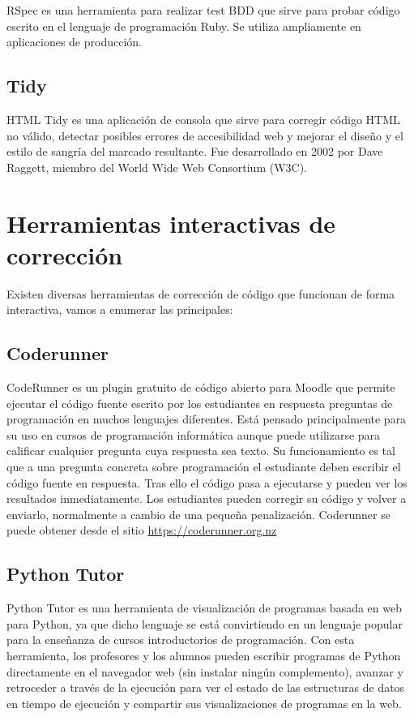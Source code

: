 RSpec es una herramienta para realizar test BDD que sirve para probar código escrito en el lenguaje de programación Ruby. Se utiliza ampliamente en aplicaciones de producción.

\subsection {Tidy}

HTML Tidy es una aplicación de consola que sirve para corregir código HTML no válido, detectar posibles errores de accesibilidad web y mejorar el diseño y el estilo de sangría del marcado resultante. Fue desarrollado en 2002 por Dave Raggett, miembro del World Wide Web Consortium (W3C).

\section {Herramientas interactivas de corrección}

Existen diversas herramientas de corrección de código que funcionan de forma interactiva, vamos a enumerar las principales:

\subsection {Coderunner}

CodeRunner es un plugin gratuito de código abierto para Moodle que permite ejecutar el código fuente escrito por los estudiantes en respuesta preguntas de programación en muchos lenguajes diferentes. Está pensado principalmente para su uso en cursos de programación informática aunque puede utilizarse para calificar cualquier pregunta cuya respuesta sea texto. Su funcionamiento es tal que a una pregunta concreta sobre programación el estudiante deben escribir el código fuente en respuesta. Tras ello el código pasa a ejecutarse y pueden ver los resultados inmediatamente. Los estudiantes pueden corregir su código y volver a enviarlo, normalmente a cambio de una pequeña penalización. Coderunner se puede obtener desde el sitio \url{https://coderunner.org.nz}

\subsection {Python Tutor}

Python Tutor es una herramienta de visualización de programas basada en web para Python, ya que dicho lenguaje se está convirtiendo en un lenguaje popular para la enseñanza de cursos introductorios de programación. Con esta herramienta, los profesores y los alumnos pueden escribir programas de Python directamente en el navegador web (sin instalar ningún complemento), avanzar y retroceder a través de la ejecución para ver el estado de las estructuras de datos en tiempo de ejecución y compartir sus visualizaciones de programas en la web.

